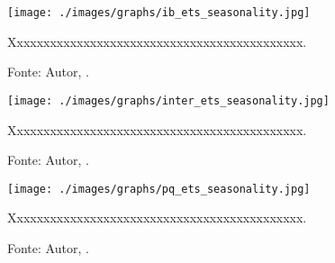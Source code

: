 
\lipsum[100]




\begin{figure}[H]
    \centering
    \texttt{[image: ./images/graphs/ib\_ets\_seasonality.jpg]}
    \caption{Xxxxxxxxxxxxxxxxxxxxxxxxxxxxxxxxxxxxxxxxxxxx.}
    \label{fig:ib_ets_seasonality.jpg}
    \caption*{Fonte: Autor, \imprimirdata.}
\end{figure}




\lipsum[100]





\begin{figure}[H]
    \centering
    \texttt{[image: ./images/graphs/inter\_ets\_seasonality.jpg]}
    \caption{Xxxxxxxxxxxxxxxxxxxxxxxxxxxxxxxxxxxxxxxxxxxx.}
    \label{fig:inter_ets_seasonality.jpg}
    \caption*{Fonte: Autor, \imprimirdata.}
\end{figure}




\lipsum[100]




\begin{figure}[H]
    \centering
    \texttt{[image: ./images/graphs/pq\_ets\_seasonality.jpg]}
    \caption{Xxxxxxxxxxxxxxxxxxxxxxxxxxxxxxxxxxxxxxxxxxxx.}
    \label{fig:pq_ets_seasonality.jpg}
    \caption*{Fonte: Autor, \imprimirdata.}
\end{figure}

